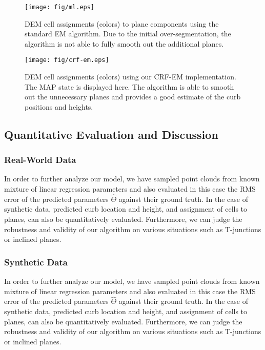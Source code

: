 \begin{figure}[t]
\centering
\texttt{[image: fig/ml.eps]}
\caption{DEM cell assignments (colors) to plane components using the standard
EM algorithm. Due to the initial over-segmentation, the algorithm is not able
to fully smooth out the additional planes.}
\label{fig:ml}
\end{figure}

\begin{figure}[t]
\centering
\texttt{[image: fig/crf-em.eps]}
\caption{DEM cell assignments (colors) using our CRF-EM implementation. The MAP
state is displayed here. The algorithm is able to smooth out the unnecessary
planes and provides a good estimate of the curb positions and heights.}
\label{fig:crf-em}
\end{figure}

\subsection{Quantitative Evaluation and Discussion}

\subsubsection{Real-World Data}

In order to further analyze our model, we have sampled point clouds from known
mixture of linear regression parameters and also evaluated in this case the RMS
error of the predicted parameters $\hat{\Theta}$ against their ground truth. In
the case of synthetic data, predicted curb location and height, and assignment
of cells to planes, can also be quantitatively evaluated. Furthermore, we can
judge the robustness and validity of our algorithm on various situations such
as T-junctions or inclined planes.

\subsubsection{Synthetic Data}

In order to further analyze our model, we have sampled point clouds from known
mixture of linear regression parameters and also evaluated in this case the RMS
error of the predicted parameters $\hat{\Theta}$ against their ground truth. In
the case of synthetic data, predicted curb location and height, and assignment
of cells to planes, can also be quantitatively evaluated. Furthermore, we can
judge the robustness and validity of our algorithm on various situations such
as T-junctions or inclined planes.
